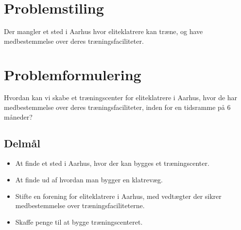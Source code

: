 \documentclass[working, oneside]{../Preambles/tuftebook}
\begin{document}
\let\cleardoublepage\clearpage
\thispagestyle{fancy}


\section*{Problemstiling}
Der mangler et sted i Aarhus hvor eliteklatrere kan træne, og have medbestemmelse over deres træningsfaciliteter.

\section*{Problemformulering}
Hvordan kan vi skabe et træningscenter for eliteklatrere i Aarhus, hvor de har medbestemmelse over deres træningsfaciliteter, inden for en tidsramme på 6 måneder?

\subsection*{Delmål}
\begin{itemize}
    \item At finde et sted i Aarhus, hvor der kan bygges et træningscenter.
    \item At finde ud af hvordan man bygger en klatrevæg.
    \item Stifte en forening for eliteklatrere i Aarhus, med vedtægter der sikrer medbestemmelse over træningsfaciliteterne.
    \item Skaffe penge til at bygge træningscenteret.
\end{itemize}
\end{document}
